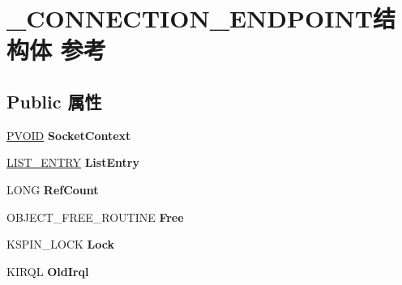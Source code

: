 \hypertarget{struct___c_o_n_n_e_c_t_i_o_n___e_n_d_p_o_i_n_t}{}\section{\+\_\+\+C\+O\+N\+N\+E\+C\+T\+I\+O\+N\+\_\+\+E\+N\+D\+P\+O\+I\+N\+T结构体 参考}
\label{struct___c_o_n_n_e_c_t_i_o_n___e_n_d_p_o_i_n_t}
\subsection*{Public 属性}
\begin{DoxyCompactItemize}
\item 
\mbox{\label{struct___c_o_n_n_e_c_t_i_o_n___e_n_d_p_o_i_n_t_ace42aa4af1e2fdb8d741fdf78a132dce}} 
\hyperlink{interfacevoid}{P\+V\+O\+ID} {\bfseries Socket\+Context}
\item 
\mbox{\label{struct___c_o_n_n_e_c_t_i_o_n___e_n_d_p_o_i_n_t_a373202b7b3bd5e5261d29cba8e9ec83f}} 
\hyperlink{struct___l_i_s_t___e_n_t_r_y}{L\+I\+S\+T\+\_\+\+E\+N\+T\+RY} {\bfseries List\+Entry}
\item 
\mbox{\label{struct___c_o_n_n_e_c_t_i_o_n___e_n_d_p_o_i_n_t_a8429d1a97012327ba441fdc00aee642f}} 
L\+O\+NG {\bfseries Ref\+Count}
\item 
\mbox{\label{struct___c_o_n_n_e_c_t_i_o_n___e_n_d_p_o_i_n_t_ad347ba72c7de6664078e010380947f0c}} 
O\+B\+J\+E\+C\+T\+\_\+\+F\+R\+E\+E\+\_\+\+R\+O\+U\+T\+I\+NE {\bfseries Free}
\item 
\mbox{\label{struct___c_o_n_n_e_c_t_i_o_n___e_n_d_p_o_i_n_t_a10527dee18afb9a338551bd81797f4eb}} 
K\+S\+P\+I\+N\+\_\+\+L\+O\+CK {\bfseries Lock}
\item 
\mbox{\label{struct___c_o_n_n_e_c_t_i_o_n___e_n_d_p_o_i_n_t_a6b8242e31ed00485aaa48ff705bd085f}} 
K\+I\+R\+QL {\bfseries Old\+Irql}
\item 
\mbox{\label{struct___c_o_n_n_e_c_t_i_o_n___e_n_d_p_o_i_n_t_a1e31ff711d27d64f3989bce5eb4a1a84}} 

\end{DoxyCompactItemize}
